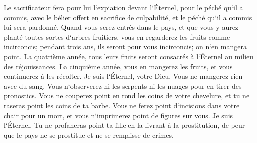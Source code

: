 \verse Le sacrificateur fera pour lui l`expiation devant l`Éternel, pour le péché qu`il a commis, avec le bélier offert en sacrifice de culpabilité, et le péché qu`il a commis lui sera pardonné. 
\verse Quand vous serez entrés dans le pays, et que vous y aurez planté toutes sortes d`arbres fruitiers, vous en regarderez les fruits comme incirconcis; pendant trois ans, ils seront pour vous incirconcis; on n`en mangera point. 
\verse La quatrième année, tous leurs fruits seront consacrés à l`Éternel au milieu des réjouissances. 
\verse La cinquième année, vous en mangerez les fruits, et vous continuerez à les récolter. Je suis l`Éternel, votre Dieu. 
\verse Vous ne mangerez rien avec du sang. Vous n`observerez ni les serpents ni les nuages pour en tirer des pronostics. 
\verse Vous ne couperez point en rond les coins de votre chevelure, et tu ne raseras point les coins de ta barbe. 
\verse Vous ne ferez point d`incisions dans votre chair pour un mort, et vous n`imprimerez point de figures sur vous. Je suis l`Éternel. 
\verse Tu ne profaneras point ta fille en la livrant à la prostitution, de peur que le pays ne se prostitue et ne se remplisse de crimes. 
